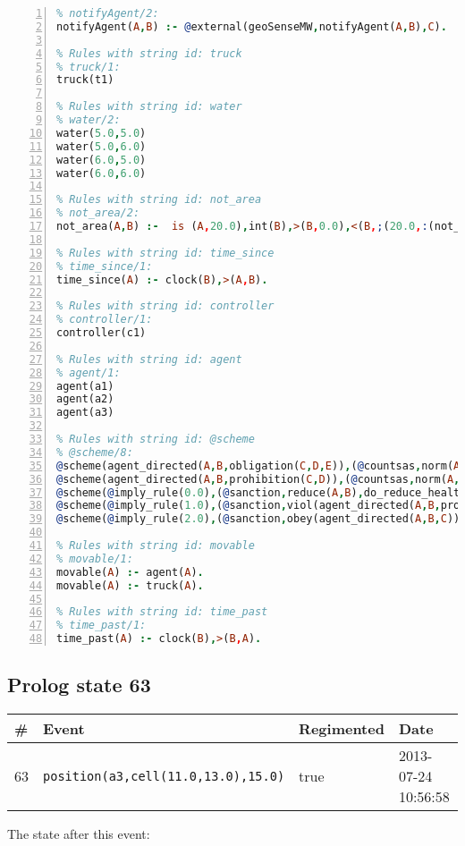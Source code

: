 \documentclass[11pt]{article}\usepackage[utf8]{inputenc}\usepackage{geometry}
\begin{document}
\begin{lstlisting}[language=Prolog, numbers=left]
% Rules with string id: notifyAgent
% notifyAgent/2:
notifyAgent(A,B) :- @external(geoSenseMW,notifyAgent(A,B),C).

% Rules with string id: truck
% truck/1:
truck(t1)

% Rules with string id: water
% water/2:
water(5.0,5.0)
water(5.0,6.0)
water(6.0,5.0)
water(6.0,6.0)

% Rules with string id: not_area
% not_area/2:
not_area(A,B) :-  is (A,20.0),int(B),>(B,0.0),<(B,;(20.0,:(not_area(A,B), is (-(B),20.0)))),int(A),>(A,0.0),<(A,;(20.0,:(area(A,B),-(int(A))))),int(B),>(A,0.0),>(B,0.0),<(A,21.0),<(B,21.0).

% Rules with string id: time_since
% time_since/1:
time_since(A) :- clock(B),>(A,B).

% Rules with string id: controller
% controller/1:
controller(c1)

% Rules with string id: agent
% agent/1:
agent(a1)
agent(a2)
agent(a3)

% Rules with string id: @scheme
% @scheme/8:
@scheme(agent_directed(A,B,obligation(C,D,E)),(@countsas,norm(A,B,F,obligation(C,D,E)),F),false,(listTrue(C)),(time_past(D)),false,[plus(viol(agent_directed(A,B,obligation(C,D,E))))|[]],[plus(obey(agent_directed(A,B,obligation(C,D,E))))|[]])
@scheme(agent_directed(A,B,prohibition(C,D)),(@countsas,norm(A,B,E,prohibition(C,D)),E),(listTrue(C)),false,(false),false,[plus(viol(agent_directed(A,B,prohibition(C,D))))|[]],[plus(obey(agent_directed(A,B,prohibition(C,D))))|[]])
@scheme(@imply_rule(0.0),(@sanction,reduce(A,B),do_reduce_health(A,B),notifyAgent(A,changed(status))),true,false,false,false,[min(reduce(A,B))|[]],[])
@scheme(@imply_rule(1.0),(@sanction,viol(agent_directed(A,B,prohibition(C,D))),do_sanction(D)),true,false,false,false,[min(viol(agent_directed(A,B,prohibition(C,D))))|[]],[])
@scheme(@imply_rule(2.0),(@sanction,obey(agent_directed(A,B,C))),true,false,false,false,[min(obey(agent_directed(A,B,C)))|[]],[])

% Rules with string id: movable
% movable/1:
movable(A) :- agent(A).
movable(A) :- truck(A).

% Rules with string id: time_past
% time_past/1:
time_past(A) :- clock(B),>(B,A).

\end{lstlisting}
\clearpage 
\subsection{Prolog state 63}
\begin{table}[ht]
\centering 
\begin{tabular}{l l l l} 
\textbf{\#} & \textbf{Event} & \textbf{Regimented} & \textbf{Date} \\ [0.5ex] 
\hline
63&\texttt{position(a3,cell(11.0,13.0),15.0)}&true&2013-07-24 10:56:58\\ [1ex] \hline\end{tabular}
\end{table}
The state after this event:
\end{document}
